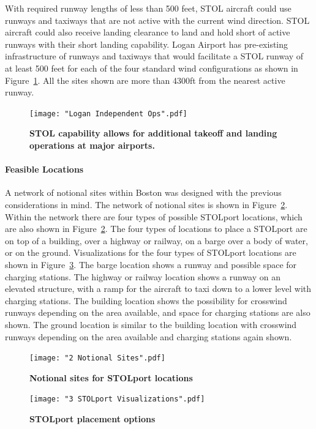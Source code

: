 \documentclass[]{aiaa-tc}%
\begin{document}
With required runway lengths of less than 500 feet, STOL aircraft could use runways and taxiways that are not active with the current wind direction. STOL aircraft could also receive landing clearance to land and hold short of active runways with their short landing capability.  Logan Airport has pre-existing infrastructure of runways and taxiways that would facilitate a STOL runway of at least 500 feet for each of the four standard wind configurations as shown in Figure~\ref{f:logan}.  All the sites shown are more than 4300ft from the nearest active runway.

\begin{figure}[h!]
	\begin{center}
	\texttt{[image: "Logan Independent Ops".pdf]}
         \caption{\textbf{STOL capability allows for additional takeoff and landing operations at major airports.}}
	\label{f:logan}
	\end{center}
\end{figure}

\paragraph{Feasible Locations}
A network of notional sites within Boston was designed with the previous considerations in mind. The network of notional sites is shown in Figure~\ref{f:nsites}. Within the network there are four types of possible STOLport locations, which are also shown in Figure~\ref{f:nsites}. The four types of locations to place a STOLport are on top of a building, over a highway or railway, on a barge over a body of water, or on the ground. Visualizations for the four types of STOLport locations are shown in Figure~\ref{f:svis}. The barge location shows a runway and possible space for charging stations.  The highway or railway location shows a runway on an elevated structure, with a ramp for the aircraft to taxi down to a lower level with charging stations. The building location shows the possibility for crosswind runways depending on the area available, and space for charging stations are also shown. The ground location is similar to the building location with crosswind runways depending on the area available and charging stations again shown. 
\begin{figure}[h!]
	\begin{center}
	\texttt{[image: "2 Notional Sites".pdf]}
    \caption{\textbf{Notional sites for STOLport locations}}
	\label{f:nsites}
	\end{center}
\end{figure}
\begin{figure}[h!]
	\begin{center}
	\texttt{[image: "3 STOLport Visualizations".pdf]}
    \caption{\textbf{STOLport placement options}}
	\label{f:svis}
	\end{center}
\end{figure}
\end{document}
